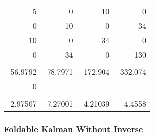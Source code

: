 \documentclass[10pt,oneside,x11names]{article}
\begin{document}
\begin{center}
\begin{tabular}{rrrr}
5 & 0 & 10 & 0\\
0 & 10 & 0 & 34\\
10 & 0 & 34 & 0\\
0 & 34 & 0 & 130\\
 &  &  & \\
-56.9792 & -78.7971 & -172.904 & -332.074\\
0 &  &  & \\
 &  &  & \\
-2.97507 & 7.27001 & -4.21039 & -4.4558\\
\end{tabular}
\end{center}

\subsubsection{Foldable Kalman Without Inverse}
\label{sec:orgheadline19}
\end{document}
